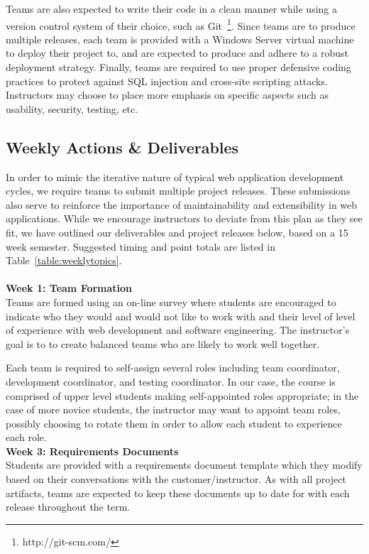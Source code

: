 \documentclass{sig-alternate}
\begin{document}
Teams are also expected to write their code in a clean manner while using a version control system of their choice, such as Git~\footnote{http://git-scm.com/}. Since teams are to produce multiple releases, each team is provided with a Windows Server virtual machine to deploy their project to, and are expected to produce and adhere to a robust deployment strategy. Finally, teams are required to use proper defensive coding practices to protect against SQL injection and cross-site scripting attacks. Instructors may choose to place more emphasis on specific aspects such as usability, security, testing, etc.


\subsection{Weekly Actions \& Deliverables}
In order to mimic the iterative nature of typical web application development cycles, we require teams to submit multiple project releases. These submissions also serve to reinforce the importance of maintainability and extensibility in web applications. While we encourage instructors to deviate from this plan as they see fit, we have outlined our deliverables and project releases below, based on a 15 week semester.  Suggested timing and point totals are listed in Table~\ref{table:weeklytopics}.\\ \\


\textbf{Week 1: Team Formation}\\
Teams are formed using an on-line survey where students are encouraged to indicate who they would and would not like to work with and their level of level of experience with web development and software engineering.  The instructor's goal is to to create balanced teams who are likely to work well together.

Each team is required to self-assign several roles including team coordinator, development coordinator, and testing coordinator. In our case, the course is comprised of upper level students making self-appointed roles appropriate; in the case of more novice students, the instructor may want to appoint team roles, possibly choosing to rotate them in order to allow each student to experience each role.
 \\

\textbf{Week 3: Requirements Documents}\\
Students are provided with a requirements document template which they modify based on their conversations with the customer/instructor. As with all project artifacts, teams are expected to keep these documents up to date for with each release throughout the term.
\end{document}
